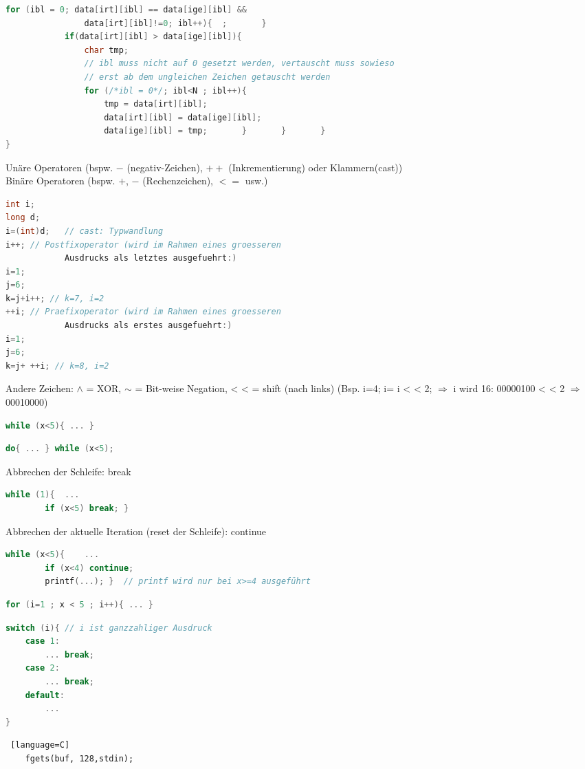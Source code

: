 \begin{multicols}{3}
\begin{lstlisting}[language=C]
			for (ibl = 0; data[irt][ibl] == data[ige][ibl] && 
				data[irt][ibl]!=0; ibl++){	;		}
			if(data[irt][ibl] > data[ige][ibl]){
				char tmp;
				// ibl muss nicht auf 0 gesetzt werden, vertauscht muss sowieso
				// erst ab dem ungleichen Zeichen getauscht werden
				for (/*ibl = 0*/; ibl<N ; ibl++){
					tmp = data[irt][ibl];
					data[irt][ibl] = data[ige][ibl];
					data[ige][ibl] = tmp;		}		}		}
}
\end{lstlisting}
\HRule[4pt]
Unäre Operatoren (bspw. $-$ (negativ-Zeichen), $++$ (Inkrementierung) oder Klammern(cast))\\
Binäre Operatoren (bspw. $+$, $-$ (Rechenzeichen), $<=$ usw.)
\begin{lstlisting}[language=C]
int i;
long d;
i=(int)d;	// cast: Typwandlung
i++; // Postfixoperator (wird im Rahmen eines groesseren 
			Ausdrucks als letztes ausgefuehrt:)
i=1;
j=6;
k=j+i++; // k=7, i=2
++i; // Praefixoperator (wird im Rahmen eines groesseren 
			Ausdrucks als erstes ausgefuehrt:)
i=1;
j=6;
k=j+ ++i; // k=8, i=2
\end{lstlisting}
Andere Zeichen: $\wedge$ = XOR, $\sim$ = Bit-weise Negation, <\! < = shift (nach links) (Bsp. i=4; i= i <\! < 2; $\Rightarrow$ i wird 16: 00000100 <\! < 2 $\Rightarrow$ 00010000)
\HRule[4pt]
\begin{lstlisting}[language=C]
	while (x<5){ ... }
\end{lstlisting}
\begin{lstlisting}[language=C]
	do{	...	} while (x<5);
\end{lstlisting}
Abbrechen der Schleife: break
\begin{lstlisting}[language=C]
	while (1){	...
		if (x<5) break; }
\end{lstlisting}
Abbrechen der aktuelle Iteration (reset der Schleife): continue
\begin{lstlisting}[language=C]
	while (x<5){	...
		if (x<4) continue;
		printf(...); }	// printf wird nur bei x>=4 ausgeführt
\end{lstlisting}
\begin{lstlisting}[language=C]
	for (i=1 ; x < 5 ; i++){ ... }
\end{lstlisting}
\begin{lstlisting}[language=C]
switch (i){ // i ist ganzzahliger Ausdruck
	case 1:
		... break;
	case 2:
		... break;
	default:
		...
}
\end{lstlisting}
\HRule[4pt]
\begin{lstlisting} [language=C]
	fgets(buf, 128,stdin);

\end{lstlisting}
\end{multicols}
